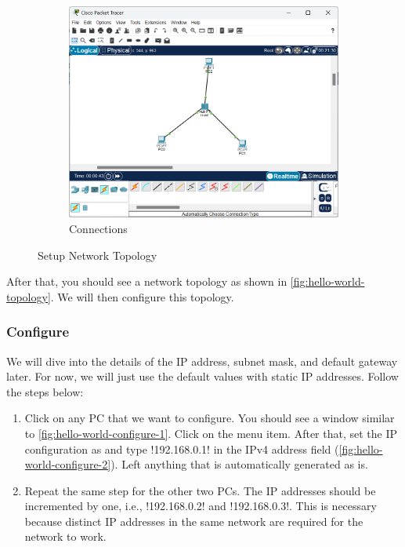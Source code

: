 \begin{figure}
\begin{subfigure}[b]{0.3\textwidth}
        \centering
        \includegraphics[width=\textwidth]{images/hello-world-3.png}
        \caption{Connections}\label{fig:hello-world-3}
    \end{subfigure}
    \caption{Setup Network Topology}\label{fig:hello-world-topology}
\end{figure}

After that, you should see a network topology as shown in \autoref{fig:hello-world-topology}. We will then configure this topology.

\subsubsection{Configure}

We will dive into the details of the IP address, subnet mask, and default
gateway later. For now, we will just use the default values with static IP
addresses. Follow the steps below:

\begin{enumerate}
    \item Click on any PC that we want to configure. You should see a window
          similar to \autoref{fig:hello-world-configure-1}. Click on the
           menu item. After that, set the IP
          configuration as  and type \mono!192.168.0.1! in the IPv4
          address field (\autoref{fig:hello-world-configure-2}). Left anything
          that is automatically generated as is.
    \item Repeat the same step for the other two PCs. The IP addresses should be
          incremented by one, i.e., \mono!192.168.0.2! and \mono!192.168.0.3!.
          This is necessary because distinct IP addresses in the same network
            are required for the network to work.
\end{enumerate}

